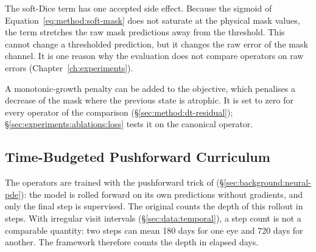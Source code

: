 The soft-Dice term has one accepted side effect. Because the sigmoid of
Equation~\eqref{eq:method:soft-mask} does not saturate at the physical mask
values, the term stretches the raw mask predictions away from the
threshold. This cannot change a thresholded prediction, but it changes
the raw error of the mask channel. It is one reason why the evaluation does
not compare operators on raw errors (Chapter~\ref{ch:experiments}).

A monotonic-growth penalty can be added to the objective, which penalises a
decrease of the mask where the previous state is atrophic. It is set to
zero for every operator of the comparison
(\S\ref{sec:method:dt-residual}); \S\ref{sec:experiments:ablations:loss}
tests it on the canonical operator.

\subsection{Time-Budgeted Pushforward Curriculum}
\label{sec:method:training:curriculum}

The operators are trained with the pushforward trick of
\citet{Brandstetter2022} (\S\ref{sec:background:neural-pde}): the model is
rolled forward on its own predictions without gradients, and only the
final step is supervised. The original counts the depth of this rollout in
steps. With irregular visit intervals (\S\ref{sec:data:temporal}), a step
count is not a comparable quantity: two steps can mean 180 days for one eye
and 720 days for another. The framework therefore counts the depth in
elapsed days.


